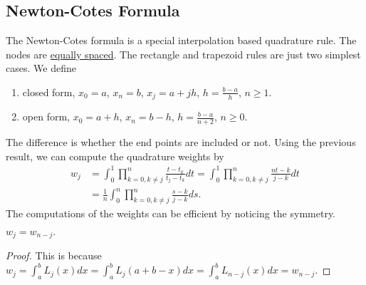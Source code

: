 \subsection{Newton-Cotes Formula}
The Newton-Cotes formula is a special interpolation based quadrature rule. The nodes are \underline{equally spaced}. The rectangle and trapezoid rules are just two simplest cases. We define 
\begin{enumerate}
    \item closed form, $x_0 = a$, $x_n = b$, $x_j = a  + jh$, $h = \frac{b-a}{h}$, $n\ge 1$. 
    \item open form, $x_0 = a + h$, $x_n = b - h$, $h = \frac{b-a}{n+2}$, $n\ge 0$.
\end{enumerate}
The difference is whether the end points are included or not. Using the previous result, we can compute the quadrature weights by 
\begin{equation}
    \begin{aligned}
        w_j &= \int_0^1 \prod_{k=0, k\neq j}^n \frac{t - t_k}{t_j - t_k} dt =  \int_0^1 \prod_{k=0, k\neq j}^n \frac{nt - k}{j- k} dt \\
        &=\frac{1}{n}\int_0^n \prod_{k=0, k\neq j}^n \frac{s - k}{j - k} ds. 
    \end{aligned}
\end{equation}
The computations of the weights can be efficient by noticing the symmetry. 
\begin{lemma} $w_j = w_{n - j}.$
\end{lemma}
\begin{proof}
    This is because $w_j = \int_a^b L_j(x) dx = \int_a^b L_j(a + b - x) dx = \int_a^b L_{n-j}(x) dx = w_{n-j}.$
\end{proof}

